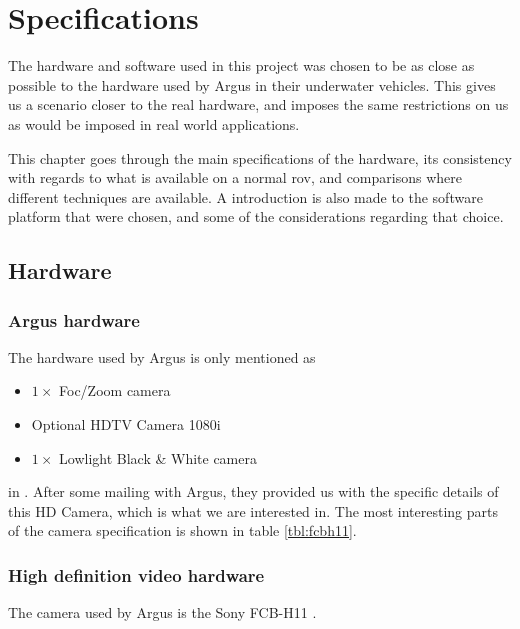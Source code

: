 
\chapter{Specifications}
The hardware and software used in this project was chosen to be as close as possible to the 
hardware used by Argus in their underwater vehicles. This gives us 
a scenario closer to the real hardware, and imposes the same 
restrictions on us as would be imposed in real world applications.

This chapter goes through the main specifications of the hardware, its consistency with 
regards to what is available on a normal \gls{rov}, and comparisons where different techniques are available.
A introduction is also made to the software platform that were chosen, and some of the considerations 
regarding that choice.

\section{Hardware}

\subsection{Argus hardware}\label{sec:argus_hw}
The hardware used by Argus is only mentioned as 

\begin{itemize}
	\item $1\times$ Foc/Zoom camera
	\item Optional HDTV Camera 1080i
	\item $1\times$ Lowlight Black \& White camera
\end{itemize}

in \citet{argusROV}. After some mailing with Argus, they provided us 
with the specific details of this HD Camera, which is what we are interested in. 
The most interesting parts of the camera specification is shown in table \vref{tbl:fcbh11}.

\subsection{High definition video hardware}\label{sec:fcb_h11_hw}
The camera used by Argus is the Sony FCB-H11 \citet{fcbh11}. 


